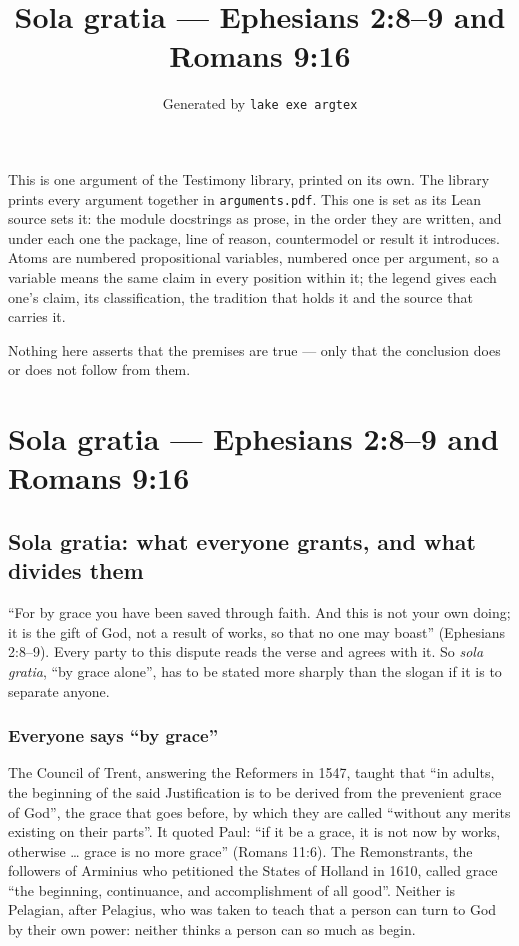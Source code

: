 \documentclass[11pt]{article}
\title{Sola gratia — Ephesians 2:8–9 and Romans 9:16}
\author{\credit{TestimonyArguments.SolaGratia}}
\date{Generated by \texttt{lake exe argtex}}
\begin{document}
\maketitle
\noindent This is one argument of the Testimony library, printed on its own. The library prints every argument together in \texttt{arguments.pdf}. This one is set as its Lean source sets it: the module docstrings as prose, in the order they are written, and under each one the package, line of reason, countermodel or result it introduces. Atoms are numbered propositional variables, numbered once per argument, so a variable means the same claim in every position within it; the legend gives each one's claim, its classification, the tradition that holds it and the source that carries it.

\noindent Nothing here asserts that the premises are true --- only that the conclusion does or does not follow from them.

\tableofcontents
\clearpage
\section*{Sola gratia — Ephesians 2:8–9 and Romans 9:16}

\subsection*{Sola gratia: what everyone grants, and what divides them}
“For by grace you have been saved through faith. And this is not your own doing; it is the gift of God, not a result of works, so that no one may boast” (Ephesians 2:8–9). Every party to this dispute reads the verse and agrees with it. So \emph{sola gratia}, “by grace alone”, has to be stated more sharply than the slogan if it is to separate anyone.

\subsubsection*{Everyone says “by grace”}
The Council of Trent, answering the Reformers in 1547, taught that “in adults, the beginning of the said Justification is to be derived from the prevenient grace of God”, the grace that goes before, by which they are called “without any merits existing on their parts”. It quoted Paul: “if it be a grace, it is not now by works, otherwise … grace is no more grace” (Romans 11:6). The Remonstrants, the followers of Arminius who petitioned the States of Holland in 1610, called grace “the beginning, continuance, and accomplishment of all good”. Neither is Pelagian, after Pelagius, who was taken to teach that a person can turn to God by their own power: neither thinks a person can so much as begin.
\end{document}
